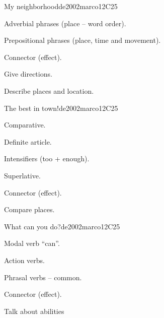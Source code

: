 \begin{syllabus}
\begin{unit}{My neighborhood}{}{de2002marco}{12}{C25}
   \begin{topics}
      \item Adverbial phrases (place – word order).
      \item Prepositional phrases (place, time and movement).
      \item Connector (effect).
   \end{topics}

   \begin{learningoutcomes}
      \item Give directions.
      \item Describe places and location.
   \end{learningoutcomes}
\end{unit}

\begin{unit}{The best in town!}{}{de2002marco}{12}{C25}
   \begin{topics}
      \item Comparative.
      \item Definite article.
      \item Intensifiers (too + enough).
      \item Superlative.
      \item Connector (effect).
   \end{topics}

   \begin{learningoutcomes}
      \item Compare places.
   \end{learningoutcomes}
\end{unit}

\begin{unit}{What can you do?}{}{de2002marco}{12}{C25}
   \begin{topics}
      \item Modal verb “can”.
      \item Action verbs.
      \item Phrasal verbs – common.
      \item Connector (effect).
   \end{topics}

   \begin{learningoutcomes}
      \item Talk about abilities
   \end{learningoutcomes}
\end{unit}


\end{syllabus}
